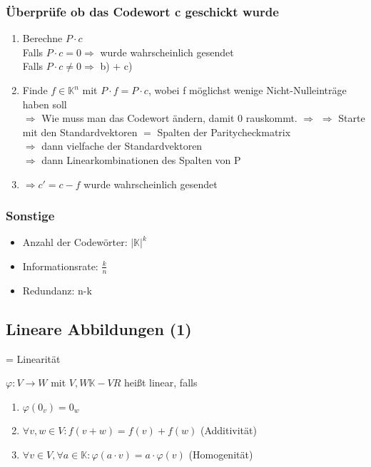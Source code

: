 \documentclass{scrartcl}
\begin{document}
\subsubsection{Überprüfe ob das Codewort c geschickt wurde}
    \begin{enumerate}
    \item Berechne $ P \cdot c $\\
    Falls $ P \cdot c = 0 \Rightarrow $ wurde wahrscheinlich gesendet\\
    Falls $ P \cdot c \neq 0 \Rightarrow $ b) + c)
    \item Finde $f \in \mathbb{K}^n $ mit $P \cdot f = P \cdot c$, wobei f möglichst wenige Nicht-Nulleinträge haben soll\\
    $\Rightarrow$ Wie muss man das Codewort ändern, damit 0 rauskommt.
    $\Rightarrow$ 
    $\Rightarrow$ Starte mit den Standardvektoren $ = $ Spalten der Paritycheckmatrix\\
    $\Rightarrow$ dann vielfache der Standardvektoren\\
    $\Rightarrow$ dann Linearkombinationen des Spalten von P
    \item $\Rightarrow c' = c - f$ wurde wahrscheinlich gesendet
    \end{enumerate}

\subsubsection{Sonstige}

\begin{itemize}
\item Anzahl der Codewörter: $|\mathbb{K}|^k$
\item Informationsrate: $\frac{k}{n}$
\item Redundanz: n-k
\end{itemize}

\subsection{Lineare Abbildungen (1)} = Linearität

$\varphi : V \rightarrow W $ mit $V, W \mathbb{K}-VR$ heißt linear, falls
\begin{enumerate}
\item $\varphi (0_v) = 0_w $
\item $\forall  v, w \in V : f(v + w) = f(v) + f(w)$ (Additivität)
\item $\forall  v \in V, \forall  a \in \mathbb{K} : \varphi (a \cdot v) = a \cdot \varphi (v) $ (Homogenität)
\end{enumerate}
\end{document}
